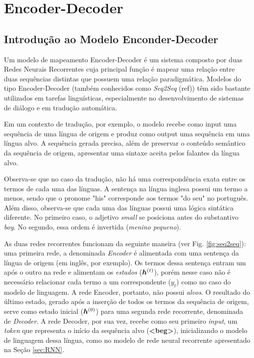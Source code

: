 \chapter{Encoder-Decoder}
\label{ch:05}


\section{Introdução ao Modelo Enconder-Decoder}
\label{sec:intro-sec-sec}
Um modelo de mapeamento Encoder-Decoder é um sistema composto por duas Redes Neurais Recorrentes cuja principal função é mapear uma relação entre duas sequências distintas que possuem uma relação paradigmática. Modelos do tipo Encoder-Decoder (também conhecidos como \textit{Seq2Seq} (ref)) têm sido bastante utilizados em tarefas linguísticas, especialmente no desenvolvimento de sistemas de diálogo e em tradução automática.

Em um contexto de tradução, por exemplo, o modelo recebe como input uma sequência de uma língua de origem e produz como output uma sequência em uma língua alvo. A sequência gerada precisa, além de preservar o conteúdo semântico da sequência de origem, apresentar uma sintaxe aceita pelos falantes da língua alvo. %


Observa-se que no caso da tradução, não há uma correspondência exata entre os termos de cada uma das línguas. A sentença na língua inglesa possui um termo a menos, sendo que o pronome "his" corresponde aos termos "do seu" no português. Além disso, observa-se que cada uma das línguas possui uma lógica sintática diferente. No primeiro caso, o adjetivo \textit{small} se posiciona antes do substantivo \textit{boy}. No segundo, essa ordem é invertida (\textit{menino pequeno}). 

As duas redes recorrentes funcionam da seguinte maneira (ver Fig. \ref{fig:seq2seq}): uma primeira rede, a denominada \textit{Encoder} é alimentada com uma sentença da língua de origem (em inglês, por exemplo). Os termos dessa sentença entram um após o outro na rede e alimentam os \textit{estados} ($\bm{h}^{(t)}$), porém nesse caso não é necessário relacionar cada termo a um correspondente ($y_t$) como no caso do modelo de linguagem. A rede Encoder, portanto, não possui \textit{alvos}. O resultado do último estado, gerado após a inserção de todos os termos da sequência de origem, serve como estado inicial ($\bm{h}^{(0)}$) para uma segunda rede recorrente, denominada de \textit{Decoder}. A rede Decoder, por sua vez, recebe como seu primeiro \textit{input}, um \textit{token} que representa o início da sequência alvo (\textbf{<beg>}), inicializando o modelo de linguagem dessa língua, como no modelo de rede neural recorrente apresentado na Seção \ref{sec:RNN}.  


